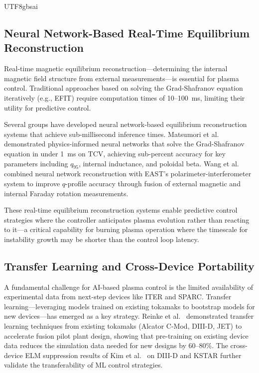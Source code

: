 \documentclass[12pt,a4paper]{article}
\begin{document}
\begin{CJK}{UTF8}{gbsai}
\subsection{Neural Network-Based Real-Time Equilibrium Reconstruction}

Real-time magnetic equilibrium reconstruction---determining the internal magnetic field structure from external measurements---is essential for plasma control. Traditional approaches based on solving the Grad-Shafranov equation iteratively (e.g., EFIT) require computation times of 10--100~ms, limiting their utility for predictive control.

Several groups have developed neural network-based equilibrium reconstruction systems that achieve sub-millisecond inference times. Matsumori et al.~\citep{Matsumori2024} demonstrated physics-informed neural networks that solve the Grad-Shafranov equation in under 1~ms on TCV, achieving sub-percent accuracy for key parameters including $q_{95}$, internal inductance, and poloidal beta. Wang et al.~\citep{Wang2024EAST} combined neural network reconstruction with EAST's polarimeter-interferometer system to improve $q$-profile accuracy through fusion of external magnetic and internal Faraday rotation measurements.

These real-time equilibrium reconstruction systems enable predictive control strategies where the controller anticipates plasma evolution rather than reacting to it---a critical capability for burning plasma operation where the timescale for instability growth may be shorter than the control loop latency.

\subsection{Transfer Learning and Cross-Device Portability}

A fundamental challenge for AI-based plasma control is the limited availability of experimental data from next-step devices like ITER and SPARC. Transfer learning---leveraging models trained on existing tokamaks to bootstrap models for new devices---has emerged as a key strategy. Reinke et al.~\citep{Reinke2024} demonstrated transfer learning techniques from existing tokamaks (Alcator C-Mod, DIII-D, JET) to accelerate fusion pilot plant design, showing that pre-training on existing device data reduces the simulation data needed for new designs by 60--80\%. The cross-device ELM suppression results of Kim et al.~\citep{Kim2024APSDPP} on DIII-D and KSTAR further validate the transferability of ML control strategies.


\end{CJK}
\end{document}
